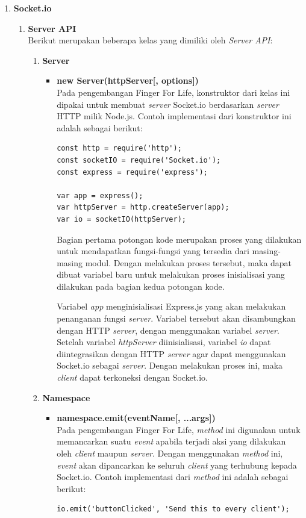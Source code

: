 \begin{enumerate}
	\item \textbf{Socket.io}
	\begin{enumerate}
		\item \textbf{Server API} \\
		Berikut merupakan beberapa kelas yang dimiliki oleh \textit{Server API}:
		\begin{enumerate}
			\item \textbf{Server}
			\begin{itemize}
				\item \textbf{new Server(httpServer[, options])} \\
				Pada pengembangan Finger For Life, konstruktor dari kelas ini dipakai untuk membuat \textit{server} Socket.io berdasarkan \textit{server} HTTP milik Node.js. Contoh implementasi dari konstruktor ini adalah sebagai berikut:
\begin{lstlisting}
const http = require('http');
const socketIO = require('Socket.io');
const express = require('express');

var app = express();
var httpServer = http.createServer(app);
var io = socketIO(httpServer);
\end{lstlisting}
				Bagian pertama potongan kode merupakan proses yang dilakukan untuk mendapatkan fungsi-fungsi yang tersedia dari masing-masing modul. Dengan melakukan proses tersebut, maka dapat dibuat variabel baru untuk melakukan proses inisialisasi yang dilakukan pada bagian kedua potongan kode.

				Variabel \textit{app} menginisialisasi Express.js yang akan melakukan penanganan fungsi \textit{server}. Variabel tersebut akan disambungkan dengan HTTP \textit{server}, dengan menggunakan variabel \textit{server}. Setelah variabel \textit{httpServer} diinisialisasi, variabel \textit{io} dapat diintegrasikan dengan HTTP \textit{server} agar dapat menggunakan Socket.io sebagai \textit{server}. Dengan melakukan proses ini, maka \textit{client} dapat terkoneksi dengan Socket.io.
				
			\end{itemize}
		
			\item \textbf{Namespace} \\
			\begin{itemize}
				\item \textbf{namespace.emit(eventName[, ...args])} \\
				Pada pengembangan Finger For Life, \textit{method} ini digunakan untuk memancarkan suatu \textit{event} apabila terjadi aksi yang dilakukan oleh \textit{client} maupun \textit{server}. Dengan menggunakan \textit{method} ini, \textit{event} akan dipancarkan ke seluruh \textit{client} yang terhubung kepada Socket.io. Contoh implementasi dari \textit{method} ini adalah sebagai berikut:
\begin{lstlisting}
io.emit('buttonClicked', 'Send this to every client');
\end{lstlisting}


\end{itemize}
\end{enumerate}
\end{enumerate}
\end{enumerate}
